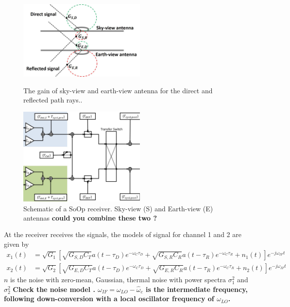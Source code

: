 \documentclass[draftcls,onecolumn]{IEEEtran}  %
\begin{document}
\begin{figure}[t!]
	\centering
    \centering
	\includegraphics[width=2.5in]{pdf/ant_gain.jpg}
	\caption{The gain of sky-view and earth-view antenna for the direct and reflected path rays..}
	\centering
	\includegraphics[width=2.5in]{pdf/hardware.pdf}
	\caption{Schematic of a SoOp receiver.  Sky-view (S) and Earth-view (E) antennas \bf could you combine these two ? \rm}
	\centering
	\label{fig:Hardware}
\end{figure}

At the  receiver receives the signals, the models of signal for channel 1 and 2 are given by
\begin{eqnarray}
 	x_1(t)&= \sqrt{G_1}
    \left[ 
       \sqrt{G_{S,D} C_T} a(t-\tau_{D}) e^{-\omega_{C} \tau_D} + 
       \sqrt{G_{S,R} C_R} a(t-\tau_{R}) e^{-\omega_{C} \tau_R} + n_1(t) 
      \right] e^{-j \omega_{IF} t} \\
    x_2(t)&=\sqrt{G_2}\left[ 
         \sqrt{G_{E,D} C_T}  a(t-\tau_{D}) e^{-\omega_{C} \tau_D} + 
         \sqrt{G_{E,R} C_R} a(t-\tau_{R}) e^{-\omega_{C} \tau_R} + n_2 (t) \right]
         e^{-j \omega_{IF} t}
  \label{Eq:x1_x2_model}
\end{eqnarray}
$n$ is the noise with zero-mean, Gaussian, thermal noise with power spectra $\sigma^2_1$ and $\sigma^2_2$ \bf Check the noise model \rm.  
$\omega_{IF} = \omega_{LO} - \hat{\omega}_c$ is the intermediate frequency, following down-conversion with a local oscillator frequency of $\omega_{LO}$. 
\end{document}
